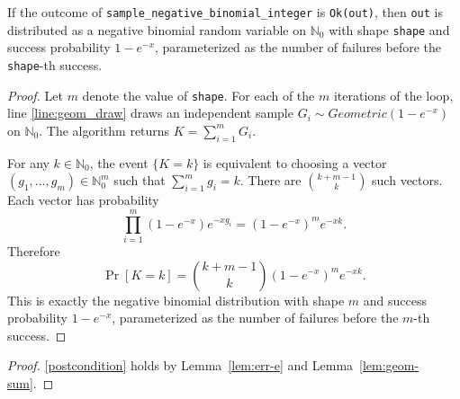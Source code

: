 \documentclass{article}
\begin{document}
\begin{lemma}
\label{lem:geom-sum}
If the outcome of \texttt{sample\_negative\_binomial\_integer} is \texttt{Ok(out)}, then \texttt{out}
is distributed as a negative binomial random variable on $\mathbb{N}_0$ with shape \texttt{shape}
and success probability $1 - e^{-x}$, parameterized as the number of failures before the
\texttt{shape}-th success.
\end{lemma}
\begin{proof}
Let $m$ denote the value of \texttt{shape}.
For each of the $m$ iterations of the loop, line \ref{line:geom_draw} draws an independent sample
$G_i \sim Geometric(1 - e^{-x})$ on $\mathbb{N}_0$.
The algorithm returns
$K = \sum_{i=1}^m G_i$.

For any $k \in \mathbb{N}_0$, the event $\{K = k\}$ is equivalent to choosing a vector
$(g_1, \ldots, g_m) \in \mathbb{N}_0^m$ such that $\sum_{i=1}^m g_i = k$.
There are $\binom{k + m - 1}{k}$ such vectors.
Each vector has probability
\begin{equation*}
\prod_{i=1}^m (1 - e^{-x}) e^{-x g_i}
= (1 - e^{-x})^m e^{-xk}.
\end{equation*}
Therefore
\begin{equation*}
\Pr[K = k]
= \binom{k + m - 1}{k} (1 - e^{-x})^m e^{-xk}.
\end{equation*}
This is exactly the negative binomial distribution with shape $m$ and success probability $1 - e^{-x}$,
parameterized as the number of failures before the $m$-th success.
\end{proof}

\begin{proof}
\ref{postcondition} holds by Lemma~\ref{lem:err-e} and Lemma~\ref{lem:geom-sum}.
\end{proof}
\end{document}
